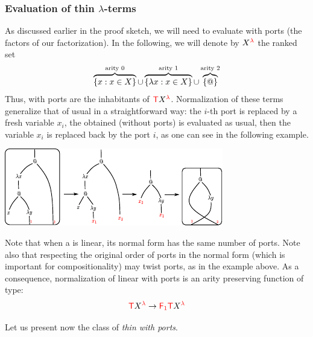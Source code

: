 \subsubsection{Evaluation of thin $\lambda$-terms}\label{subsub:thin}

As discussed earlier in the proof sketch, we will need to evaluate \lambdaterms with ports (the factors of our factorization). In the following, we will denote by ${X}^{{\color{red}{\lambda}}}$ the ranked set 
\begin{align*}
     \overbrace{\{x : x \in X\}}^{\text{arity 0}} \cup \overbrace{\{\lambda x : x \in X\}}^{\text{arity 1}} \cup  \overbrace{\{@\}}^{\text{arity 2}}
\end{align*}
Thus, \lambdaterms with ports are the inhabitants of ${\color{red}{\mathsf T}} {X}^{{\color{red}{\lambda}}}$. Normalization of these terms generalize that of usual \lambdaterms in a straightforward way: the $i$-th port is replaced by a fresh variable $x_i$, the obtained \lambdaterm (without ports) is evaluated as usual, then the variable $x_i$ is replaced back by the port $i$, as one can see in the following example.  
  \begin{center}
\includegraphics[scale=1.5]{normalization-with-ports.pdf}
\end{center}
  Note that when a \lambdaterm is linear, its normal form has the same number of ports. Note also that respecting the original order of ports in the normal form (which is important for compositionality) may twist ports, as in the example above. As a consequence, normalization of linear \lambdaterms with ports is an arity preserving function of  type:
  \begin{align*}
  {\color{red}{\mathsf T}} {X}^{{\color{red}{\lambda}}} \to {\color{red}{\mathsf F_{1}}}{\color{red}{\mathsf T}} {X}^{{\color{red}{\lambda}}} 
  \end{align*}
   
Let us present now the class of \emph{thin \lambdaterms with ports}.
 
